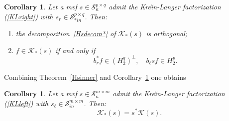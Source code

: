 \documentclass[12pt,twoside,a4paper]{amsart}
\newtheorem{corollary}[thm]{Corollary}
\theoremstyle{definition}
\numberwithin{equation}{section}
\begin{document}
\begin{corollary}\label{Hs*inner}
Let a mvf $s \in {\mathcal S}_{\kappa}^{p\times q}$ admit the Kre\u{\i}n-Langer
factorization (\ref{KLright}) with $s_r \in {\mathcal S}_{*in}^{p\times q}$. Then:
\begin{enumerate}
\item[(1)]
the decomposition~\eqref{Hsdecom*} of ${{\mathcal K}}_*(s)$ is orthogonal; \vskip 6pt
\item[(2)]
$f\in{{\mathcal K}}_*(s)$ if and only if
\begin{equation}\label{eq:1.350}
    b_r^*f\in (H_2^q)^\perp,\quad b_{\ell}sf\in H_2^p.
\end{equation}
\end{enumerate}
\end{corollary}
Combining Theorem~\ref{Hsinner}  and Corollary~\ref{Hs*inner} one
obtains
\begin{corollary}\label{Hsin*in}
Let a mvf $s \in {\mathcal S}_{\kappa}^{m\times m}$ admit the
Kre\u{\i}n-Langer factorization (\ref{KLleft}) with $s_{\ell} \in {\mathcal
S}_{in}^{m\times m}$. Then:
\[
{{\mathcal K}}_*(s)=s^*{{\mathcal K}}(s).
\]
\end{corollary}
\end{document}
